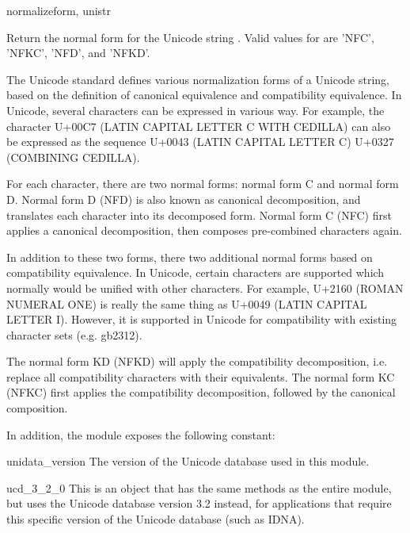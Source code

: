 \begin{funcdesc}{normalize}{form, unistr}

Return the normal form  for the Unicode string .
Valid values for  are 'NFC', 'NFKC', 'NFD', and 'NFKD'.

The Unicode standard defines various normalization forms of a Unicode
string, based on the definition of canonical equivalence and
compatibility equivalence. In Unicode, several characters can be
expressed in various way. For example, the character U+00C7 (LATIN
CAPITAL LETTER C WITH CEDILLA) can also be expressed as the sequence
U+0043 (LATIN CAPITAL LETTER C) U+0327 (COMBINING CEDILLA).

For each character, there are two normal forms: normal form C and
normal form D. Normal form D (NFD) is also known as canonical
decomposition, and translates each character into its decomposed form.
Normal form C (NFC) first applies a canonical decomposition, then
composes pre-combined characters again.

In addition to these two forms, there two additional normal forms
based on compatibility equivalence. In Unicode, certain characters are
supported which normally would be unified with other characters. For
example, U+2160 (ROMAN NUMERAL ONE) is really the same thing as U+0049
(LATIN CAPITAL LETTER I). However, it is supported in Unicode for
compatibility with existing character sets (e.g. gb2312).

The normal form KD (NFKD) will apply the compatibility decomposition,
i.e. replace all compatibility characters with their equivalents. The
normal form KC (NFKC) first applies the compatibility decomposition,
followed by the canonical composition.

\end{funcdesc}

In addition, the module exposes the following constant:

\begin{datadesc}{unidata_version}
The version of the Unicode database used in this module.

\end{datadesc}

\begin{datadesc}{ucd_3_2_0}
This is an object that has the same methods as the entire
module, but uses the Unicode database version 3.2 instead,
for applications that require this specific version of
the Unicode database (such as IDNA).

\end{datadesc}
